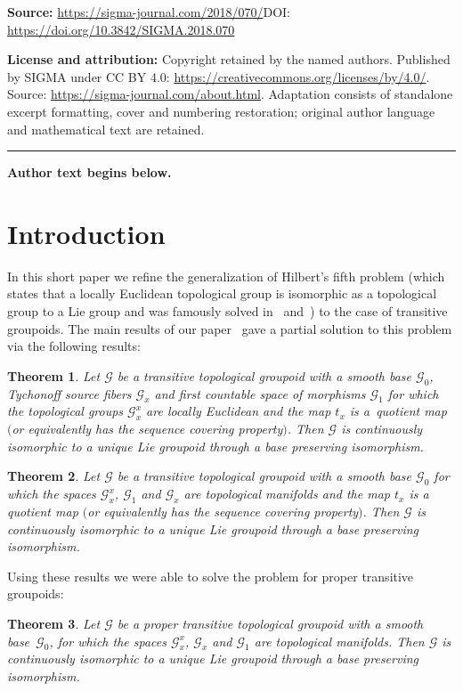 \documentclass[11pt]{article}
\newtheorem{tw}{Theorem}[section]
\begin{document}
\noindent\textbf{Source:} \url{https://sigma-journal.com/2018/070/}\quad DOI: \url{https://doi.org/10.3842/SIGMA.2018.070}\par
\noindent\textbf{License and attribution:} Copyright retained by the named authors. Published by SIGMA under CC BY 4.0: \url{https://creativecommons.org/licenses/by/4.0/}. Source: \url{https://sigma-journal.com/about.html}. Adaptation consists of standalone excerpt formatting, cover and numbering restoration; original author language and mathematical text are retained.\par
\medskip\hrule\medskip\noindent\textbf{Author text begins below.}\par
\setcounter{section}{0}
\setcounter{subsection}{0}
\setcounter{subsubsection}{0}
\setcounter{tw}{0}
\setcounter{equation}{0}
\section{Introduction}
In this short paper we refine the generalization of Hilbert's fifth problem (which states that a locally Euclidean topological group is isomorphic as a topological group to a Lie group and was famously solved in~\cite{G} and~\cite{MZ}) to the case of transitive groupoids. The main results of our paper~\cite{H5oids} gave a partial solution to this problem via the following results:
\begin{tw}\label{strong}
Let $\mathcal{G}$ be a transitive topological groupoid with a smooth base $\mathcal{G}_0$, Tychonoff source fibers $\mathcal{G}_x$ and first countable space of morphisms $\mathcal{G}_1$ for which the topological groups $\mathcal{G}_x^x$ are locally Euclidean and the map $t_x$ is a~quotient map $($or equivalently has the sequence covering property$)$. Then $\mathcal{G}$ is continuously isomorphic to a unique Lie groupoid through a base preserving isomorphism.
\end{tw}

\begin{tw}\label{SE} Let $\mathcal{G}$ be a transitive topological groupoid with a smooth base $\mathcal{G}_0$ for which the spaces $\mathcal{G}_x^x$, $\mathcal{G}_1$ and $\mathcal{G}_x$ are topological manifolds and the map $t_x$ is a quotient map $($or equivalently has the sequence covering property$)$. Then $\mathcal{G}$ is continuously isomorphic to a unique Lie groupoid through a base preserving isomorphism.
\end{tw}
Using these results we were able to solve the problem for proper transitive groupoids:
\begin{tw}\label{prop} Let $\mathcal{G}$ be a proper transitive topological groupoid with a smooth base~$\mathcal{G}_0$, for which the spaces $\mathcal{G}_x^x$, $\mathcal{G}_x$ and $\mathcal{G}_1$ are topological manifolds. Then $\mathcal{G}$ is continuously isomorphic to a unique Lie groupoid through a base preserving isomorphism.
\end{tw}
\end{document}
